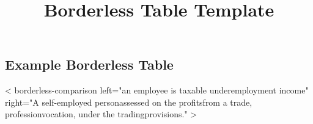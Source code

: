 \documentclass[
  letterpaper,
  DIV=11,
  numbers=noendperiod]{scrartcl}
\title{Borderless Table Template}
\author{}
\date{}
\begin{document}
\maketitle


\subsection{Example Borderless Table}\label{example-borderless-table}

{{< borderless-comparison    left="an employee is taxable under\nthe employment income\nprovisions"   right="A self-employed person\nis assessed on the profits\nderived from a trade, profession\nor vocation, under the trading\nincome provisions." >}}
\end{document}
